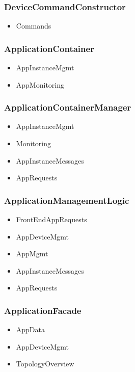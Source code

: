     \subsubsection{DeviceCommandConstructor}
        \begin{itemize}
            \item Commands
        \end{itemize}

   \subsubsection{ApplicationContainer}
        \begin{itemize}
            \item AppInstanceMgmt
            \item AppMonitoring
        \end{itemize}

    \subsubsection{ApplicationContainerManager}
        \begin{itemize}
            \item AppInstanceMgmt
            \item Monitoring
            \item AppInstanceMessages
            \item AppRequests
        \end{itemize}

    \subsubsection{ApplicationManagementLogic}
        \begin{itemize}
            \item FrontEndAppRequests
            \item AppDeviceMgmt
            \item AppMgmt
            \item AppInstanceMessages
            \item AppRequests
        \end{itemize}


    \subsubsection{ApplicationFacade}
        \begin{itemize}
            \item AppData
            \item AppDeviceMgmt
            \item TopologyOverview
        \end{itemize}
        
